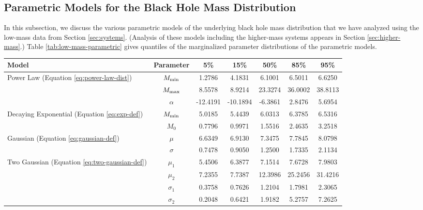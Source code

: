 \documentclass[preprint]{aastex}
\newcommand{\Mmin}{M_{\textnormal{min}}}
\newcommand{\Mmax}{M_{\textnormal{max}}}
\begin{document}
\subsection{Parametric Models for the Black Hole Mass Distribution}
\label{sec:parametric-models}

In this subsection, we discuss the various parametric models of the
underlying black hole mass distribution that we have analyzed using
the low-mass data from Section \ref{sec:systems}.  (Analysis of these
models including the higher-mass systems appears in Section
\ref{sec:higher-mass}.)  Table \ref{tab:low-mass-parametric} gives
quantiles of the marginalized parameter distributions of the
parametric models.

\begin{table}
  \begin{center}
    \begin{tabular}{|l|c|c|c|c|c|c|}
      \hline
      Model & Parameter & 5\% & 15\% & 50\% & 85\% & 95\% \\
      \hline \hline
      Power Law (Equation \eqref{eq:power-law-dist}) & $\Mmin$ & 
      1.2786 &  4.1831 &  6.1001 &  6.5011 &  6.6250 \\
      \hline
       & $\Mmax$ & 8.5578 &  8.9214 & 23.3274 & 36.0002 & 38.8113 \\
       \hline
       & $\alpha$ & -12.4191 & -10.1894 & -6.3861 &  2.8476 &  5.6954 \\
       \hline \hline
       Decaying Exponential (Equation \eqref{eq:exp-def}) & $\Mmin$ & 
       5.0185 &  5.4439 &  6.0313 &  6.3785 &  6.5316 \\
       \hline
       & $M_0$ & 0.7796 &  0.9971 & 1.5516 &  2.4635 &  3.2518 \\
       \hline \hline
       Gaussian (Equation \eqref{eq:gaussian-def}) & $\mu$ & 
       6.6349 &  6.9130 &  7.3475 & 7.7845 & 8.0798 \\
       \hline
       & $\sigma$ & 0.7478 &  0.9050  & 1.2500 &  1.7335 & 2.1134 \\
       \hline \hline
       Two Gaussian (Equation \eqref{eq:two-gaussian-def}) & $\mu_1$ & 
       5.4506 &  6.3877 &  7.1514 &  7.6728  & 7.9803 \\
       \hline
       & $\mu_2$ & 7.2355 &  7.7387 & 12.3986 & 25.2456 & 31.4216 \\
       \hline
       & $\sigma_1$ & 0.3758 &  0.7626 &  1.2104 &  1.7981 &  2.3065 \\
       \hline
       & $\sigma_2$ & 0.2048 & 0.6421 & 1.9182 &  5.2757  & 7.2625 \\

\end{tabular}
\end{center}
\end{table}
\end{document}
